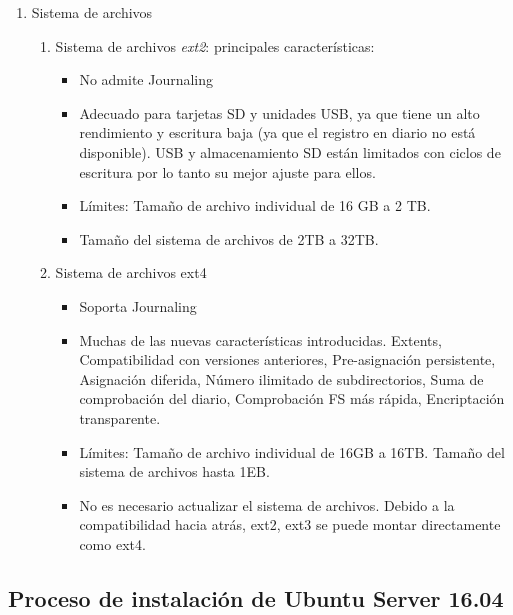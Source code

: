 \documentclass[
]{memoir}
\providecommand{\tightlist}{%
  \setlength{\itemsep}{0pt}\setlength{\parskip}{0pt}}
\begin{document}
\begin{enumerate}
\def\labelenumi{\arabic{enumi}.}
\setcounter{enumi}{4}
\tightlist
\item
  Sistema de archivos

  \begin{enumerate}
  \def\labelenumii{\alph{enumii}.}
  \tightlist
  \item
    Sistema de archivos \emph{ext2}: principales características:

    \begin{itemize}
    \tightlist
    \item
      No admite Journaling
    \item
      Adecuado para tarjetas SD y unidades USB, ya que tiene un alto rendimiento y escritura baja (ya que el registro en diario no está disponible). USB y almacenamiento SD están limitados con ciclos de escritura por lo tanto su mejor ajuste para ellos.
    \item
      Límites: Tamaño de archivo individual de 16 GB a 2 TB.
    \item
      Tamaño del sistema de archivos de 2TB a 32TB.
    \end{itemize}
  \item
    Sistema de archivos ext4

    \begin{itemize}
    \tightlist
    \item
      Soporta Journaling
    \item
      Muchas de las nuevas características introducidas. Extents, Compatibilidad con versiones anteriores, Pre-asignación persistente, Asignación diferida, Número ilimitado de subdirectorios, Suma de comprobación del diario, Comprobación FS más rápida, Encriptación transparente.
    \item
      Límites: Tamaño de archivo individual de 16GB a 16TB. Tamaño del sistema de archivos hasta 1EB.
    \item
      No es necesario actualizar el sistema de archivos. Debido a la compatibilidad hacia atrás, ext2, ext3 se puede montar directamente como ext4.
    \end{itemize}
  \end{enumerate}
\end{enumerate}

\hypertarget{proceso-de-instalaciuxf3n-de-ubuntu-server-16.04}{%
\subsection{Proceso de instalación de Ubuntu Server 16.04}\label{proceso-de-instalaciuxf3n-de-ubuntu-server-16.04}}
\end{document}
